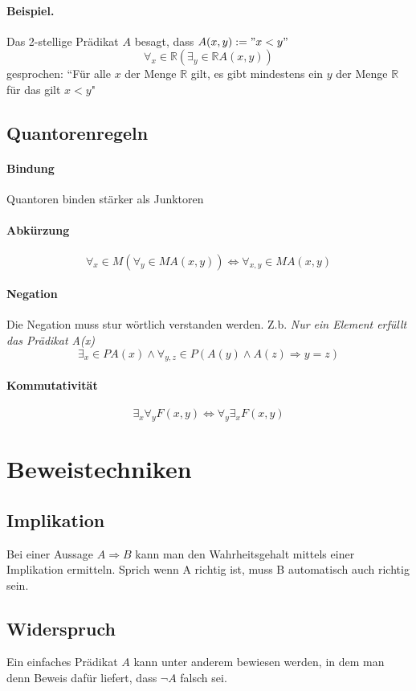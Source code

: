 \documentclass{article}
\begin{document}
\paragraph{Beispiel.} Das 2-stellige Prädikat \(A\) besagt, dass \(A(x,y) := "x<y"\)
\[
		\forall_x \in \mathbb{R} (\exists_y \in \mathbb{R} A(x,y))
\]
gesprochen: ``Für alle \(x\) der Menge \( \mathbb{R}\) gilt, es gibt mindestens ein \(y\) der Menge \( \mathbb{R}\) für das gilt \(x<y\)"
\subsection{Quantorenregeln}
\paragraph{Bindung} 
Quantoren binden stärker als Junktoren
\paragraph{Abkürzung}
\[
		\forall_x \in M (\forall_y \in M A(x,y)) \Leftrightarrow \forall_{x,y} \in M A(x,y)
\]
\paragraph{Negation}
Die Negation muss stur wörtlich verstanden werden. Z.b. \textit{Nur ein Element erfüllt das Prädikat A(x)} \[
		\exists_x \in P A(x) \wedge \forall_{y,z} \in P (A(y) \wedge A(z) \Rightarrow y=z)
\]
\paragraph{Kommutativität}
$$\exists_x \forall_y F(x,y) \Leftrightarrow \forall_y \exists_x F(x,y)$$

\section{Beweistechniken}
\subsection{Implikation}
Bei einer Aussage \(A \Rightarrow B\) kann man den Wahrheitsgehalt mittels einer Implikation ermitteln. Sprich wenn A richtig ist, muss B automatisch auch richtig sein.
\subsection{Widerspruch}
Ein einfaches Prädikat \(A\) kann unter anderem bewiesen werden, in dem man denn Beweis dafür liefert, dass \(\neg A \) falsch sei.
\end{document}
